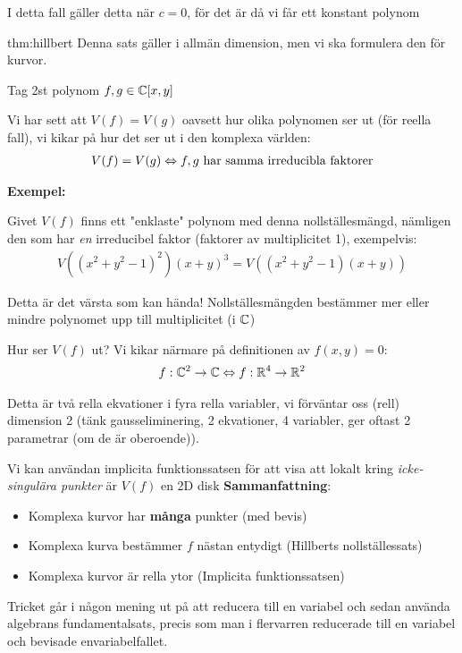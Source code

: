 \noindent I detta fall gäller detta när $c=0$, för det är då vi får ett konstant polynom
\par\bigskip
\begin{theo}{thm:hillbert}
  Denna sats gäller i allmän dimension, men vi ska formulera den för kurvor.\par
  \noindent Tag 2st polynom $f,g\in\mathbb{C}[x,y]$\par
  \noindent Vi har sett att $V(f) = V(g)$ oavsett hur olika polynomen ser ut (för reella fall), vi kikar på hur det ser ut i den komplexa världen:
  \begin{equation*}
    \begin{gathered}
      V(f) = V(g)\Leftrightarrow\text{$f,g$ har samma irreducibla faktorer}
    \end{gathered}
  \end{equation*}
\end{theo}
\par\bigskip
\noindent\textbf{Exempel:}\par
\noindent Givet $V(f)$ finns ett "enklaste" polynom med denna nollställesmängd, nämligen den som har \textit{en} irreducibel faktor (faktorer av multiplicitet 1), exempelvis:
\begin{equation*}
  \begin{gathered}
    V((x^2+y^2-1)^2)(x+y)^3 = V((x^2+y^2-1)(x+y))
  \end{gathered}
\end{equation*}\par
\noindent Detta är det värsta som kan hända! Nollställesmängden bestämmer mer eller mindre polynomet upp till multiplicitet (i $\mathbb{C}$)
\par\bigskip
\noindent Hur ser $V(f)$ ut? Vi kikar närmare på definitionen av $f(x,y) = 0$:
\begin{equation*}
  \begin{gathered}
    f:\mathbb{C}^2\to\mathbb{C} \Leftrightarrow f:\mathbb{R}^4\to\mathbb{R}^2
  \end{gathered}
\end{equation*}\par
\noindent Detta är två rella ekvationer i fyra rella variabler, vi förväntar oss (rell) dimension 2 (tänk gausseliminering, 2 ekvationer, 4 variabler, ger oftast 2 parametrar (om de är oberoende)).\par
\noindent Vi kan användan implicita funktionssatsen för att visa att lokalt kring \textit{icke-singulära punkter} är $V(f)$ en 2D disk
\newpage
\noindent\textbf{Sammanfattning}:
\begin{itemize}
  \item Komplexa kurvor har \textbf{många} punkter (med bevis)
  \item Komplexa kurva bestämmer $f$ nästan entydigt (Hillberts nollställessats)
  \item Komplexa kurvor är rella ytor (Implicita funktionssatsen)
\end{itemize}\par
\noindent Tricket går i någon mening ut på att reducera till en variabel och sedan använda algebrans fundamentalsats, precis som man i flervarren reducerade till en variabel och bevisade envariabelfallet.
\newpage
